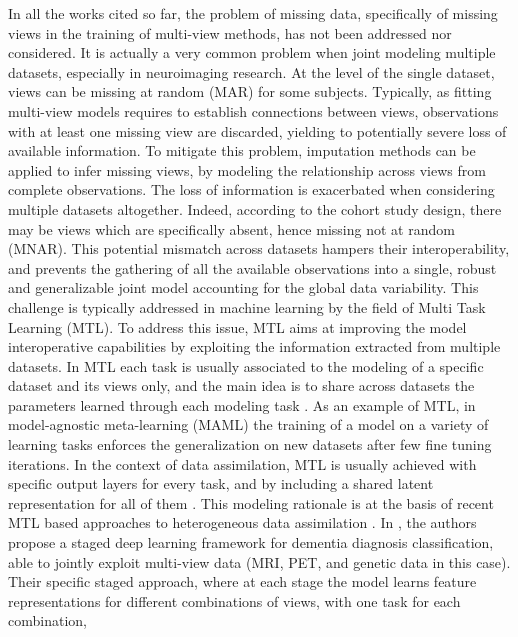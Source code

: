 In all the works cited so far, the problem of missing data, specifically of missing views in the training of multi-view methods, has not been addressed nor considered.
It is actually a very common problem when joint modeling multiple datasets, especially in neuroimaging research.
At the level of the single dataset, views can be missing at random (MAR) for some subjects.
Typically, as fitting multi-view models requires to establish connections between views, observations with at least one missing view are discarded, yielding to potentially severe loss of available information.
To mitigate this problem, imputation methods can be applied to infer missing views, by modeling the relationship across views from complete observations.
%
The loss of information is exacerbated when considering multiple datasets altogether.
Indeed, according to the cohort study design, there may be views which are specifically absent, hence missing not at random (MNAR).
This potential mismatch across datasets hampers their interoperability,
and prevents the gathering of all the available observations into a single, robust and generalizable joint model accounting for the global data variability.
%
This challenge is typically addressed in machine learning by the field of Multi Task Learning (MTL).
To address this issue, MTL aims at improving the model interoperative capabilities by exploiting the information extracted from multiple datasets.
In MTL each task is usually associated to the modeling of a specific dataset and its views only,
and the main idea is to share across datasets the parameters learned through each modeling task \citep{Caruana1998, Dorado-Moreno2020}.
As an example of MTL, in model-agnostic meta-learning (MAML) \citep{MAML1} the training of a model on a variety of learning tasks enforces the generalization on new datasets after few fine tuning iterations.
%
In the context of data assimilation, MTL is usually achieved with specific output layers for every task, and by including a shared latent representation for all of them \citep{Dorado-Moreno2020}.
This modeling rationale is at the basis of recent MTL based approaches to heterogeneous data assimilation \citep{Wu2018, Shi2019}.
In \cite{Zhou2019a}, the authors propose a staged deep learning framework for dementia diagnosis classification,
able to jointly exploit multi-view data (MRI, PET, and genetic data in this case).
Their specific staged approach, where at each stage the model learns feature representations for different combinations of views, with one task for each combination,
